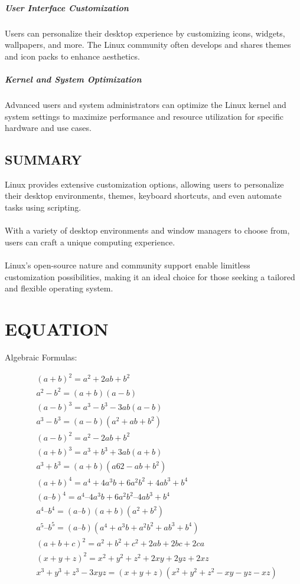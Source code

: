 \documentclass{article}
\begin{document}
\subparagraph{User Interface Customization}
Users can personalize their desktop experience by customizing icons, widgets, wallpapers, and more. The Linux community often develops and shares themes and icon packs to enhance aesthetics.

\subparagraph{Kernel and System Optimization}
Advanced users and system administrators can optimize the Linux kernel and system settings to maximize performance and resource utilization for specific hardware and use cases.


\subsection{SUMMARY}
Linux provides extensive customization options, allowing users to personalize their desktop environments, themes, keyboard shortcuts, and even automate tasks using scripting.
\paragraph{}
With a variety of desktop environments and window managers to choose from, users can craft a unique computing experience.
\paragraph{}
Linux's open-source nature and community support enable limitless customization possibilities, making it an ideal choice for those seeking a tailored and flexible operating system.
\newpage

\section{EQUATION}
Algebraic Formulas:

\begin{align}
	&(a+b)^2 = a^2 + 2ab + b^2\\ 
	&a^2 - b^2 = (a+b)(a-b) \\
	&(a-b)^3 = a^3 - b^3 -3ab(a-b) \\
	&a^3-b^3 =  (a-b)(a^2+ab+b^2) \\
	&(a-b)^2 = a^2 - 2ab + b^2 \\
	&(a+b)^3 = a^3 + b^3 + 3ab(a+b) \\
	&a^3 + b^3 = (a+b)(a62-ab+b^2) \\
	&(a + b)^4 = a^4 + 4a^3b + 6a^2b^2 + 4ab^3 + b^4\\
	&(a – b)^4 = a^4 – 4a^3b + 6a^2b^2 – 4ab^3 + b^4\\
	&a^4 – b^4 = (a – b)(a + b)(a^2 + b^2)\\
	&a^5 – b^5 = (a – b)(a^4 + a^3b + a^2b^2 + ab^3 + b^4)\\
	&(a +b+ c)^2=a^2+b^2+c^2+2ab+2bc+2ca\\
	&(x+ y+ z)^2=x^2+y^2+z^2+2xy+2yz+2xz\\
	&x^3 + y^3 + z^3 - 3xyz = (x + y + z)(x^2 + y^2 + z^2 - xy - yz - xz)
\end{align}
\end{document}
